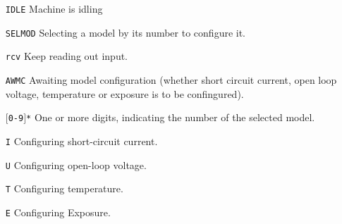 \documentclass{article}
\begin{document}
\vspace{2em}

\begin{itemize}
    \item[\texttt{IDLE}]
        Machine is idling
    \item[\texttt{SELMOD}]
        Selecting a model by its number to configure it.
    \item[\texttt{rcv}]
        Keep reading out input.
    \item[\texttt{AWMC}]
        Awaiting model configuration (whether short circuit current, open loop
        voltage, temperature or exposure is to be confingured).
    \item[\texttt{$[$0-9$]$*}]
        One or more digits, indicating the number of the selected model.
    \item[\texttt{I}]
        Configuring short-circuit current.
    \item[\texttt{U}]
        Configuring open-loop voltage.
    \item[\texttt{T}]
        Configuring temperature.
    \item[\texttt{E}]
        Configuring Exposure.
\end{itemize}
\end{document}
